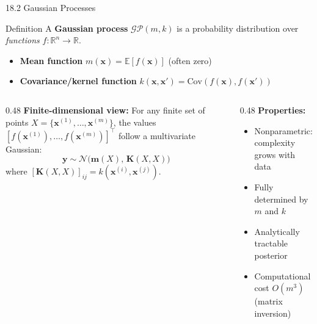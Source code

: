 \documentclass[aspectratio=169,10pt]{beamer}
\newcommand{\bx}{\mathbf{x}}
\newcommand{\Real}{\mathbb{R}}
\newcommand{\Norm}{\mathcal{N}}
\newcommand{\GP}{\mathcal{GP}}
\begin{document}
\begin{frame}{18.2 Gaussian Processes}
  \begin{block}{Definition}
    A \textbf{Gaussian process} $\GP(m, k)$ is a probability distribution over
    \emph{functions} $f : \Real^n \to \Real$.
    \begin{itemize}
      \item \textbf{Mean function} $m(\bx) = \mathbb{E}[f(\bx)]$
            (often zero)
      \item \textbf{Covariance/kernel function} $k(\bx,\bx') =
            \mathrm{Cov}(f(\bx),f(\bx'))$
    \end{itemize}
  \end{block}
  \vspace{0.3em}
  \begin{columns}[T]
    \begin{column}{0.48\textwidth}
      \textbf{Finite-dimensional view:}  For any finite set of points
      $X = \{\bx^{(1)},\ldots,\bx^{(m)}\}$, the values
      $[f(\bx^{(1)}),\ldots,f(\bx^{(m)})]^\top$ follow a multivariate
      Gaussian:
      \[
        \mathbf{y} \sim \Norm\bigl(\mathbf{m}(X),\,\mathbf{K}(X,X)\bigr)
      \]
      where $[\mathbf{K}(X,X)]_{ij} = k(\bx^{(i)},\bx^{(j)})$.
    \end{column}
    \begin{column}{0.48\textwidth}
      \textbf{Properties:}
      \begin{itemize}
        \item Nonparametric: complexity grows with data
        \item Fully determined by $m$ and $k$
        \item Analytically tractable posterior
        \item Computational cost $O(m^3)$ (matrix inversion)
      \end{itemize}
    \end{column}
  \end{columns}
\end{frame}
\end{document}
